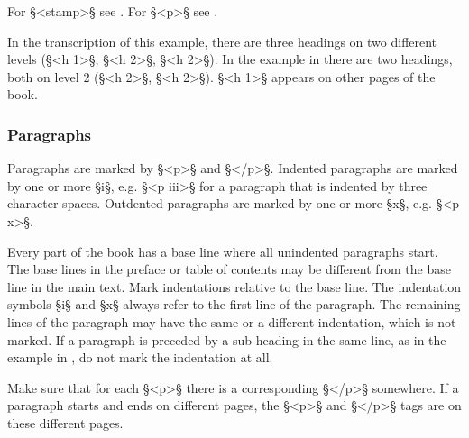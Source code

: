 \documentclass[fontsize=11pt, paper=a4, 
DIV15,
headings=normal,
parskip=half-, 
numbers=noenddot]{scrartcl}
\begin{document}
\vspace{-8mm}
\begin{crossref}
For §<stamp>§ see . For §<p>§ see . 
\end{crossref}

\vspace{5mm}
\begin{note}
In the transcription of this example, there are three headings on two different levels (§<h 1>§, §<h 2>§, §<h 2>§). In the example in  there are two headings, both on level 2 (§<h 2>§, §<h 2>§). §<h 1>§ appears on other pages of the book.
\end{note}




\subsubsection{Paragraphs}
\label{section chinese paragraphs}

\begin{mainrule}
Paragraphs are marked by §<p>§ and §</p>§. Indented paragraphs are marked by one or more §i§, e.g. §<p iii>§ for a paragraph that is indented by three character spaces. Outdented paragraphs are marked by one or more §x§, e.g. §<p x>§.
\end{mainrule}

\begin{clarification}
Every part of the book has a base line where all unindented paragraphs start. The base lines in the preface or table of contents may be different from the base line in the main text. Mark indentations relative to the base line. The indentation symbols §i§ and §x§ always refer to the first line of the paragraph. The remaining lines of the paragraph may have the same or a different indentation, which is not marked. If a paragraph is preceded by a sub-heading in the same line, as in the example in , do not mark the indentation at all. 
\end{clarification}

\begin{clarification}
Make sure that for each §<p>§ there is a corresponding §</p>§ somewhere. If a paragraph starts and ends on different pages, the §<p>§ and §</p>§ tags are on these different pages.
\end{clarification}
\end{document}
